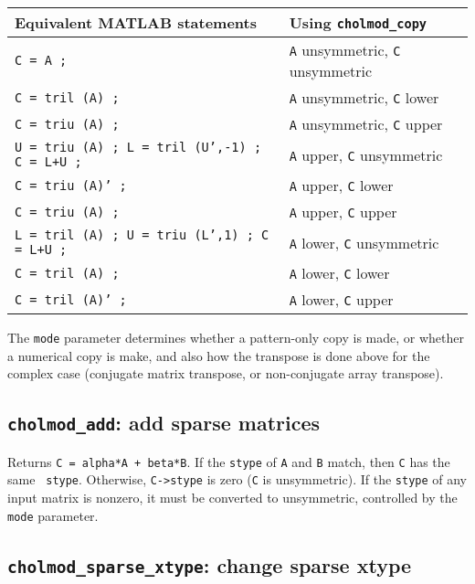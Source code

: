 \documentclass[11pt]{article}
\begin{document}
{\small
\begin{tabular}{ll}
\hline
Equivalent MATLAB statements    & Using {\tt cholmod\_copy} \\
\hline
{\tt C = A ;                    }& {\tt A} unsymmetric, {\tt C} unsymmetric \\
{\tt C = tril (A) ;             }& {\tt A} unsymmetric, {\tt C} lower \\
{\tt C = triu (A) ;             }& {\tt A} unsymmetric, {\tt C} upper \\
{\tt U = triu (A) ; L = tril (U',-1) ; C = L+U ;}
                                & {\tt A} upper, {\tt C} unsymmetric \\
{\tt C = triu (A)' ;            }& {\tt A} upper, {\tt C} lower \\
{\tt C = triu (A) ;             }& {\tt A} upper, {\tt C} upper \\
{\tt L = tril (A) ; U = triu (L',1) ; C = L+U ;}
                                & {\tt A} lower, {\tt C} unsymmetric \\
{\tt C = tril (A) ;             }& {\tt A} lower, {\tt C} lower \\
{\tt C = tril (A)' ;            }& {\tt A} lower, {\tt C} upper \\
\hline
\end{tabular}}

\vspace{0.1in}
The \verb'mode' parameter determines whether a pattern-only copy is made, or
whether a numerical copy is make, and also how the transpose is done above for
the complex case (conjugate matrix transpose, or non-conjugate array
transpose).

\subsection{{\tt cholmod\_add}: add sparse matrices}


Returns {\tt C = alpha*A + beta*B}.
If the {\tt stype} of {\tt A} and {\tt B} match, then {\tt C} has the same {\tt
stype}.  Otherwise, {\tt C->stype} is zero ({\tt C} is unsymmetric).  If the
\verb'stype' of any input matrix is nonzero, it must be converted to
unsymmetric, controlled by the \verb'mode' parameter.

\subsection{{\tt cholmod\_sparse\_xtype}: change sparse xtype}
\end{document}
